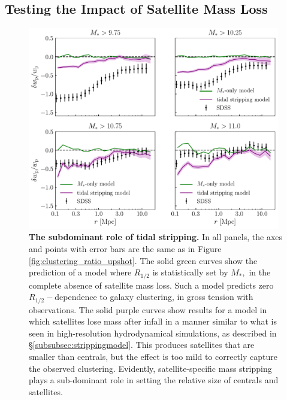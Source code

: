 \documentclass[usenatbib,usegraphicx,letterpaper]{mn2e}
\newcommand{\rhalf}{R_{1/2}}
\newcommand{\mstar}{M_{\ast}}
\begin{document}
\subsection{Testing the Impact of Satellite Mass Loss}
\label{subsec:mstar_stripping}
\begin{figure}
\centering
\includegraphics[width=11cm]{FIGS/alt_model_wp_ratios.pdf}
\caption{
{\bf The subdominant role of tidal stripping.}
In all panels, the axes and points with error bars are the same as in Figure \ref{fig:clustering_ratio_upshot}. The solid green curves show the prediction of a model where $\rhalf$ is statistically set by $\mstar,$ in the complete absence of satellite mass loss. Such a model predicts zero $\rhalf-$dependence to galaxy clustering, in gross tension with observations. The solid purple curves show results for a model in which satellites lose mass after infall in a manner similar to what is seen in high-resolution hydrodynamical simulations, as described in \S\ref{subsubsec:strippingmodel}. This produces satellites that are smaller than centrals, but the effect is too mild to correctly capture the observed clustering. Evidently, satellite-specific mass stripping plays a sub-dominant role in setting the relative size of centrals and satellites.
}
\label{fig:mstarmodelclustering}
\end{figure}
\end{document}
